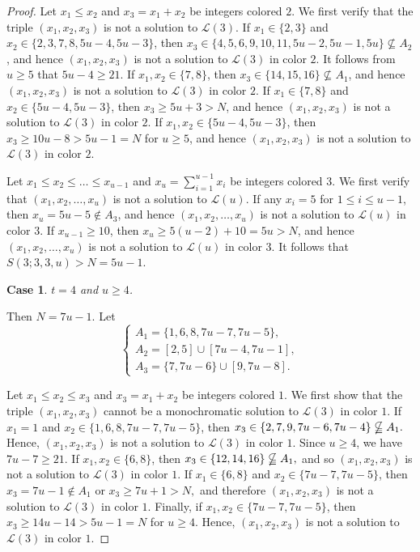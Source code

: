 \documentclass[twoside, 12pt]{article}
\newtheorem{case}{Case}
\begin{document}
\begin{proof}
Let \(x_1 \leq x_2\)  and $x_3=x_1+x_2$ be integers colored \(2\). We first verify that the triple \((x_1,x_2,x_3)\) is not a solution to \(\mathcal{L}(3)\).
If $x_1 \in \{2,3\}$ and $x_2 \in \{2,3,7,8,5u-4,5u-3\}$, then $x_3\in \{4,5,6,9,10,11,5u-2,5u-1,5u\} \nsubseteq A_2$, and hence $(x_1, x_2, x_3 )$ is not a solution to \(\mathcal{L}(3)\) in color $2$.
It follows from \(u \geq 5\) that \(5u-4 \geq 21\).
If $x_1, x_2 \in \{7,8\}$, then $x_3 \in \{14,15,16\} \nsubseteq A_1$, and hence $(x_1, x_2, x_3 )$ is not a solution to \(\mathcal{L}(3)\) in color $2$.
If $x_1 \in \{7,8\}$ and $x_2 \in \{5u-4,5u-3\}$, then $x_3 \geq 5u+3 >N$, and hence $(x_1, x_2, x_3 )$ is not a solution to \(\mathcal{L}(3)\) in color $2$. If $x_1, x_2 \in \{5u-4,5u-3\}$, then $x_3 \geq 10u-8> 5u-1=N$ for $u \geq 5$, and hence $(x_1, x_2, x_3 )$ is not a solution to \(\mathcal{L}(3)\) in color $2$.


Let \(x_1 \leq x_2 \leq \ldots \leq x_{u-1}\) and $x_u=\sum_{i=1}^{u-1} x_i$ be integers colored \(3\). We first verify that \((x_1,x_2,\ldots, x_u)\) is not a solution to \(\mathcal{L}(u)\).
If any $x_i=5$ for $1 \leq i \leq u-1$,
then $x_u=5u-5 \notin A_3$, and hence \((x_1,x_2,\ldots, x_u)\) is not a solution to \(\mathcal{L}(u)\) in color $3$.
If $x_{u-1} \geq 10$, then $x_u \geq 5(u-2)+10=5u >N$, and hence \((x_1,x_2,\ldots, x_u)\) is not a solution to \(\mathcal{L}(u)\) in color $3$.
It follows that $S(3;3,3,u)>N=5u-1$.


\begin{case}
$t=4$ and $u \geq 4$.
\end{case}

Then $N=7u-1$. Let
\begin{equation*}
\begin{cases}
A_1 =\{1,6,8,7u-7,7u-5\}, \\
A_2= [2,5]\cup [7u-4, 7u-1], \\
A_3 =\{7,7u-6\} \cup [9,7u-8].
\end{cases}
\end{equation*}

Let \(x_1 \leq x_2 \leq x_3\) and $x_3=x_1+x_2$ be integers colored \(1\). We first show that the triple \((x_1,x_2,x_3)\) cannot be a monochromatic solution to \(\mathcal{L}(3)\) in color \(1\).
If \(x_1=1\) and \(x_2 \in \{1,6,8,7u-7,7u-5\}\), then $x_3 \in \{2,7,9,7u-6,7u-4\} \nsubseteqq A_1.$
Hence, \((x_1,x_2,x_3)\) is not a solution to \(\mathcal{L}(3)\) in color \(1\). Since \(u \geq 4\), we have \(7u-7 \geq 21\). If \(x_1,x_2 \in \{6,8\}\), then
$x_3 \in \{12,14,16\} \nsubseteqq A_1,$
and so \((x_1,x_2,x_3)\) is not a solution to \(\mathcal{L}(3)\) in color \(1\). If \(x_1 \in \{6,8\}\) and \(x_2 \in \{7u-7,7u-5\}\), then $x_3=7u-1 \notin A_1$ or $x_3 \geq 7u+1 > N,$
and therefore \((x_1,x_2,x_3)\) is not a solution to \(\mathcal{L}(3)\) in color \(1\). Finally, if \(x_1,x_2 \in \{7u-7,7u-5\}\), then $x_3 \geq 14 u-14 > 5u-1 =N $ for \(u \geq 4\). Hence, \((x_1,x_2,x_3)\) is not a solution to \(\mathcal{L}(3)\) in color \(1\).


\end{proof}
\end{document}
